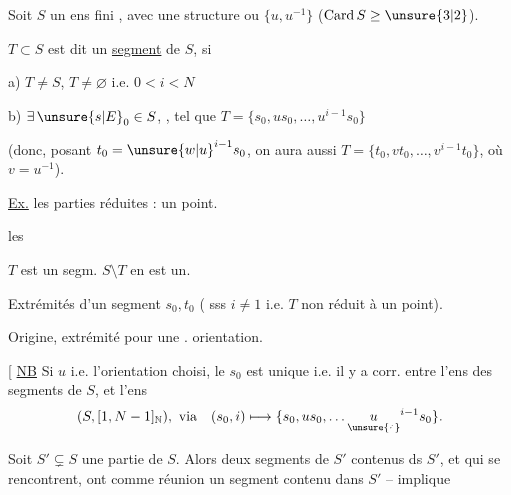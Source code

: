 Soit $S$ un ens fini , avec une structure  ou  $\{u,u^{-1}\}$ ($\mathrm{Card}\,S\geq\unsure{3|2}$).\unsure{,}

 $T\subset S$  est dit un  \uline{segment} de $S$, si

a)  $T\ne S$, $T\ne\varnothing$  i.e. $0<i<N$

b) $\exists\,\unsure{s|E}_0\in S$, , tel que $T=\{s_0,us_0,\ldots,u^{i-1}s_0\}$

(donc, posant $t_0={\unsure{w|u}}^{i-1}s_0$, on aura aussi $T=\{t_0,vt_0,\ldots,v^{i-1}t_0\}$, où $v=u^{-1}$).

\uline{Ex.} les parties réduites : un point.

les 


$T$ est un segm.  $S\setminus T$ en est un.




Extrémités d'un segment $s_0,t_0$ ( sss $i\ne1$ i.e. $T$ non réduit à un point).

Origine, extrémité pour une . orientation.

[ \uline{NB} Si $u$ i.e. l'orientation choisi, le $s_0$ est unique i.e. il y a corr.  entre l'ens des segments de $S$, et l'ens
\[
 (S,[1,N-1]_{\mathbb N}),\ \text{via}\quad (s_0,i)\longmapsto\{s_0,us_0,\ldots \underset{\unsure{\cdot\!{}^{\cdot}}}{u}^{i-1}s_0\}.
\]

Soit $S'\subsetneq S$ une partie de $S$. Alors  deux segments de $S'$ contenus ds $S'$, et qui se rencontrent, ont comme réunion un segment  contenu dans $S'$ --  implique

\clearpage
